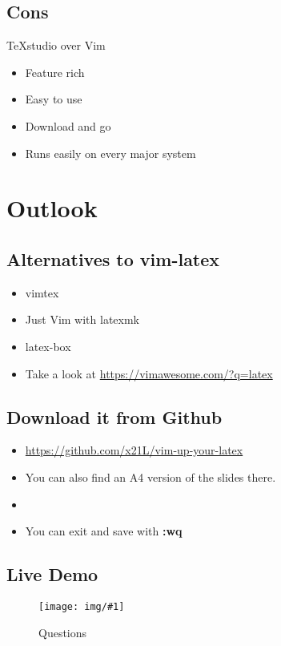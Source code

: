 \documentclass[aspectratio=169]{beamer}
\newenvironment{MyPicture}[4]{
  \begin{figure}[h!]
    \centering
    \texttt{[image: img/\#1]}
    \caption{#2}
    \label{fig:#3}
  }
{\end{figure}}
\begin{document}
\subsection{Cons}
\begin{frame}{TeXstudio over Vim}
  \begin{itemize}
    \item Feature rich
    \item Easy to use
    \item Download and go
    \item Runs easily on every major system
  \end{itemize}
\end{frame}
\section{Outlook}
\subsection{Alternatives to vim-latex}
\begin{frame}{}
  \begin{itemize}
    \item vimtex
    \item Just Vim with latexmk
    \item latex-box
    \item Take a look at \url{https://vimawesome.com/?q=latex}
  \end{itemize}
\end{frame}
\subsection{Download it from Github}
\begin{frame}{}
  \begin{itemize}
    \item \url{https://github.com/x21L/vim-up-your-latex}
    \item You can also find an A4 version of the slides there.
    \item[]
    \item You can exit and save with \textbf{:wq}
  \end{itemize}
\end{frame}
\subsection{Live Demo}
\begin{frame}{}
\end{frame}
\begin{frame}{}
  \begin{MyPicture}{questions}{Questions}{Questions}{width=0.3\textwidth}
  \end{MyPicture}
\end{frame}
\end{document}

